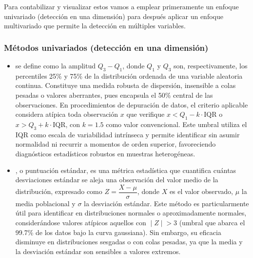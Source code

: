 \documentclass[a4paper,10pt,spanish]{jupyterBook}
\begin{document}
\sphinxAtStartPar
Para contabilizar y visualizar estos  vamos a emplear primeramente un enfoque univariado (detección en una dimensión) para después aplicar un enfoque multivariado que permite la detección en múltiples variables.


\subsubsection{Métodos univariados (detección en una dimensión)}
\label{\detokenize{content/03/Analisis:metodos-univariados-deteccion-en-una-dimension}}\begin{itemize}
\item {}
\sphinxAtStartPar
{} se define como la amplitud \(Q_{3}-Q_{1}\), donde \(Q_{1}\) y \(Q_{3}\) son, respectivamente, los percentiles 25\% y 75\% de la distribución ordenada de una variable aleatoria continua. Constituye una medida robusta de dispersión, insensible a colas pesadas o valores aberrantes, pues encapsula el 50\% central de las observaciones. En procedimientos de depuración de datos, el criterio aplicable considera atípica toda observación \(x\) que verifique \(x < Q_{1}-k\cdot \text{IQR}\) o \(x > Q_{3}+k\cdot \text{IQR}\), con \(k=1.5\) como valor convencional. Este umbral utiliza el IQR como escala de variabilidad intrínseca y permite identificar  sin asumir normalidad ni recurrir a momentos de orden superior, favoreciendo diagnósticos estadísticos robustos en muestras heterogéneas.

\item {}
\sphinxAtStartPar
{}, o puntuación estándar, es una métrica estadística que cuantifica cuántas desviaciones estándar se aleja una observación del valor medio de la distribución, expresado como \(Z=\dfrac{X−μ}{σ}\), donde \(X\) es el valor observado, \(μ\) la media poblacional y \(σ\) la desviación estándar. Este método es particularmente útil para identificar  en distribuciones normales o aproximadamente normales, considerándose valores atípicos aquellos con \(∣Z∣>3\) (umbral que abarca el 99.7\% de los datos bajo la curva gaussiana). Sin embargo, su eficacia disminuye en distribuciones sesgadas o con colas pesadas, ya que la media y la desviación estándar son sensibles a valores extremos.

\end{itemize}
\end{document}
